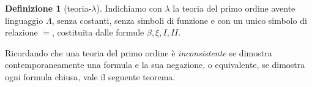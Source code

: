 \documentclass[a4paper,11pt]{article}
\theoremstyle{definition}
\newtheorem{defn}{Definizione}
\begin{document}
\begin{defn}[teoria-$\lambda$]
  Indichiamo con $\lambda$ la teoria del primo ordine avente linguaggio
  $\Lambda$, senza costanti, senza simboli di funzione e con un unico simbolo
  di relazione $\dot =$, costituita dalle formule $\beta,\xi,I,II$.
\end{defn}

Ricordando che una teoria del primo ordine è \textit{inconsistente} se
dimostra contemporaneamente una formula e la sua negazione, o equivalente, se
dimostra ogni formula chiusa, vale il seguente teorema.
\end{document}
